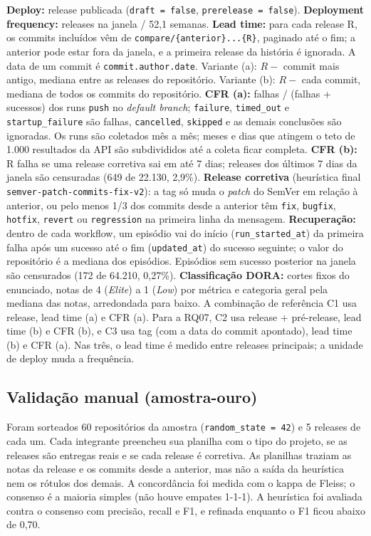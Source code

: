\documentclass[12pt]{article}
\begin{document}
\textbf{Deploy:} release publicada (\texttt{draft = false}, \texttt{prerelease = false}). \textbf{Deployment frequency:} releases na janela / 52,1 semanas.
\textbf{Lead time:} para cada release R, os commits incluídos vêm de \texttt{compare/\{anterior\}...\{R\}}, paginado até o fim; a anterior pode estar fora da janela, e a primeira release da história é ignorada. A data de um commit é \texttt{commit.author.date}. Variante (a): $R - $ commit mais antigo, mediana entre as releases do repositório. Variante (b): $R - $ cada commit, mediana de todos os commits do repositório.
\textbf{CFR (a):} falhas / (falhas + sucessos) dos runs \texttt{push} no \textit{default branch}; \texttt{failure}, \texttt{timed\_out} e \texttt{startup\_failure} são falhas, \texttt{cancelled}, \texttt{skipped} e as demais conclusões são ignoradas. Os runs são coletados mês a mês; meses e dias que atingem o teto de 1.000 resultados da API são subdivididos até a coleta ficar completa.
\textbf{CFR (b):} R falha se uma release corretiva sai em até 7 dias; releases dos últimos 7 dias da janela são censuradas (649 de 22.130, 2,9\%).
\textbf{Release corretiva} (heurística final \texttt{semver-patch-commits-fix-v2}): a tag só muda o \textit{patch} do SemVer em relação à anterior, ou pelo menos 1/3 dos commits desde a anterior têm \texttt{fix}, \texttt{bugfix}, \texttt{hotfix}, \texttt{revert} ou \texttt{regression} na primeira linha da mensagem.
\textbf{Recuperação:} dentro de cada workflow, um episódio vai do início (\texttt{run\_started\_at}) da primeira falha após um sucesso até o fim (\texttt{updated\_at}) do sucesso seguinte; o valor do repositório é a mediana dos episódios. Episódios sem sucesso posterior na janela são censurados (172 de 64.210, 0,27\%).
\textbf{Classificação DORA:} cortes fixos do enunciado, notas de 4 (\textit{Elite}) a 1 (\textit{Low}) por métrica e categoria geral pela mediana das notas, arredondada para baixo. A combinação de referência C1 usa release, lead time (a) e CFR (a). Para a RQ07, C2 usa release + pré-release, lead time (b) e CFR (b), e C3 usa tag (com a data do commit apontado), lead time (b) e CFR (a). Nas três, o lead time é medido entre releases principais; a unidade de deploy muda a frequência.

\subsection{Validação manual (amostra-ouro)}

Foram sorteados 60 repositórios da amostra (\texttt{random\_state = 42}) e 5 releases de cada um. Cada integrante preencheu sua planilha com o tipo do projeto, se as releases são entregas reais e se cada release é corretiva. As planilhas traziam as notas da release e os commits desde a anterior, mas não a saída da heurística nem os rótulos dos demais. A concordância foi medida com o kappa de Fleiss; o consenso é a maioria simples (não houve empates 1-1-1). A heurística foi avaliada contra o consenso com precisão, recall e F1, e refinada enquanto o F1 ficou abaixo de 0,70.
\end{document}
